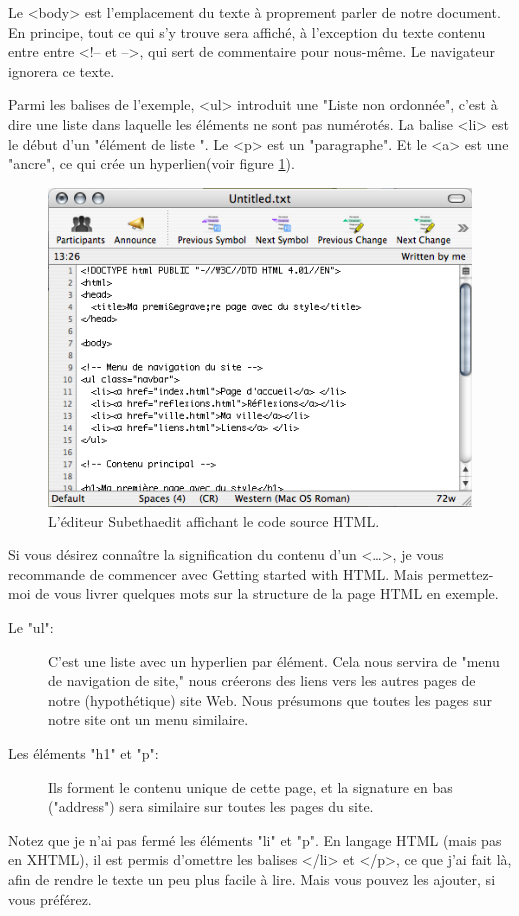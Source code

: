  Le <body> est l'emplacement du texte à proprement parler de notre document. En principe, tout ce qui s'y trouve sera affiché, à l'exception du texte contenu entre entre <!-- et -->, qui sert de commentaire pour nous-même. Le navigateur ignorera ce texte.
 
 Parmi les balises de l'exemple, <ul> introduit une "Liste non ordonnée", c'est à dire une liste dans laquelle les éléments ne sont pas numérotés. La balise <li> est le début d'un "élément de liste ". Le <p> est un "paragraphe". Et le <a> est une "ancre", ce qui crée un hyperlien(voir figure \ref{fig:screen2}). 

\begin{figure}[t]
	\begin{center}
		\includegraphics{voronin/img/capture.png}
		\caption{L'éditeur Subethaedit affichant le code source HTML.}
		\label{fig:screen2}		
	\end{center}
\end{figure}
Si vous désirez connaître la signification du contenu d'un <…>, je vous recommande de commencer avec Getting started with HTML. Mais permettez-moi de vous livrer quelques mots sur la structure de la page HTML en exemple.
\begin{description}
	\item[Le "ul":] C'est une liste avec un hyperlien par élément. Cela nous servira de "menu de navigation de site," nous créerons des liens vers les autres pages de notre (hypothétique) site Web. Nous présumons que toutes les pages sur notre site ont un menu similaire.
	\item[Les éléments "h1" et "p":] Ils forment le contenu unique de cette page, et la signature en bas ("address") sera similaire sur toutes les pages du site. 
\end{description}
Notez que je n'ai pas fermé les éléments "li" et "p". En langage HTML (mais pas en XHTML), il est permis d'omettre les balises </li> et </p>, ce que j'ai fait là, afin de rendre le texte un peu plus facile à lire. Mais vous pouvez les ajouter, si vous préférez. 
\normalsize

